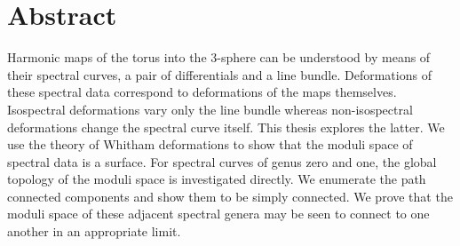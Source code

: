 
\section*{Abstract}
Harmonic maps of the torus into the 3-sphere can be understood by means of their spectral curves, a pair of differentials and a line bundle. Deformations of these spectral data correspond to deformations of the maps themselves. Isospectral deformations vary only the line bundle whereas non-isospectral deformations change the spectral curve itself. This thesis explores the latter. We use the theory of Whitham deformations to show that the moduli space of spectral data is a surface. For spectral curves of genus zero and one, the global topology of the moduli space is investigated directly. We enumerate the path connected components and show them to be simply connected. We prove that the moduli space of these adjacent spectral genera may be seen to connect to one another in an appropriate limit.
